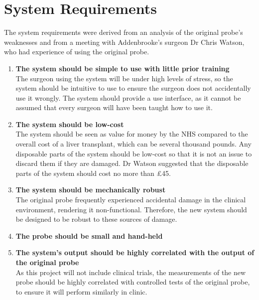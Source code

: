 \section{System Requirements}

The system requirements were derived from an analysis of the original probe's weaknesses and from a meeting with Addenbrooke's surgeon Dr Chris Watson, who had experience of using the original probe.


\begin{enumerate}
\item \label{req: simple} \textbf{The system should be simple to use with little prior training}\\
The surgeon using the system will be under high levels of stress, so the system should be intuitive to use to ensure the surgeon does not accidentally use it wrongly. The system should provide a use interface, as it cannot be assumed that every surgeon will have been taught how to use it.

\item \label{req: cheap} \textbf{The system should be low-cost}\\
The system should be seen as value for money by the NHS compared to the overall cost of a liver transplant, which can be several thousand pounds. Any disposable parts of the system should be low-cost so that it is not an issue to discard them if they are damaged. Dr Watson suggested that the disposable parts of the system should cost no more than £45.

\item \label{req: robust} \textbf{The system should be mechanically robust}\\
The original probe frequently experienced accidental damage in the clinical environment, rendering it non-functional. Therefore, the new system should be designed to be robust to these sources of damage.

\item \label{req: small} \textbf{The probe should be small and hand-held}\\



\item \label{req: correlation} \textbf{The system's output should be highly correlated with the output of the original probe}\\
As this project will not include clinical trials, the measurements of the new probe should be highly correlated with controlled tests of the original probe, to ensure it will perform similarly in clinic.




\end{enumerate}
